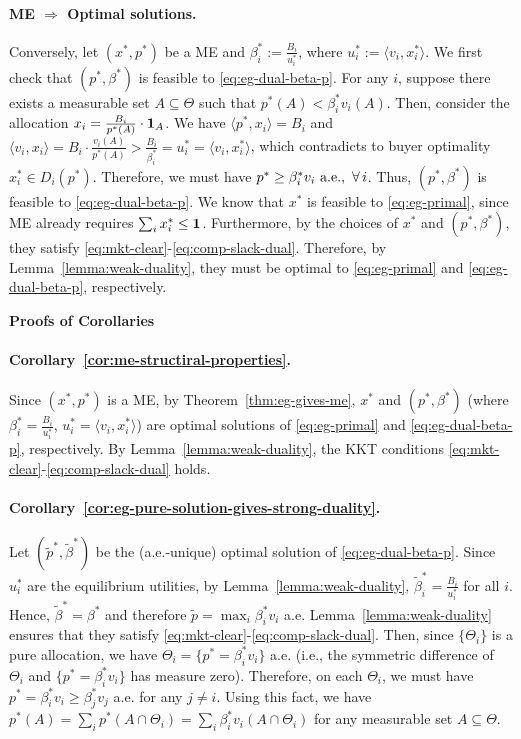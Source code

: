 	\paragraph{ME $\Rightarrow$ Optimal solutions.}
	Conversely, let $(x^*, p^*)$ be a ME and $\beta^*_i := \frac{B_i}{u^*_i}$, where $u^*_i := \langle v_i, x^*_i \rangle$. We first check that $(p^*, \beta^*)$ is feasible to \eqref{eq:eg-dual-beta-p}. For any $i$, suppose there exists a measurable set $A\subseteq \Theta$ such that $p^*(A) < \beta^*_i v_i(A)$. Then, consider the allocation $x_i = \frac{B_i}{p^*(A)} \cdot \mathbf{1}_A$. 
	We have 
	$\langle p^*, x_i \rangle = B_i$
	and 
	$\langle v_i, x_i\rangle = B_i \cdot \frac{v_i(A)}{p^*(A)} > \frac{B_i}{\beta^*_i} = u^*_i = \langle v_i, x^*_i \rangle$,
	which contradicts to buyer optimality $x^*_i \in D_i(p^*)$. 
	Therefore, we must have
	 $p^* \geq \beta^*_i v_i \ \textnormal{a.e.},\ \forall\, i$.
	Thus, $(p^*, \beta^*)$ is feasible to \eqref{eq:eg-dual-beta-p}.
	We know that $x^*$ is feasible to \eqref{eq:eg-primal}, since ME already requires $\sum_i x^*_i \leq \mathbf{1}$.
	Furthermore, by the choices of $x^*$ and $(p^*, \beta^*)$, they satisfy \eqref{eq:mkt-clear}-\eqref{eq:comp-slack-dual}.
	Therefore, by Lemma~\ref{lemma:weak-duality}, they must be optimal to \eqref{eq:eg-primal} and \eqref{eq:eg-dual-beta-p}, respectively. 

	\smallskip\noindent\textbf{Proofs of Corollaries}
	\paragraph{Corollary~\ref{cor:me-structiral-properties}.} 
	Since $(x^*, p^*)$ is a ME, by Theorem~\ref{thm:eg-gives-me}, $x^*$ and $(p^*, \beta^*)$ (where $\beta^*_i = \frac{B_i}{u^*_i}$, $u^*_i = \langle v_i, x^*_i\rangle$) are optimal solutions of \eqref{eq:eg-primal} and \eqref{eq:eg-dual-beta-p}, respectively. By Lemma~\ref{lemma:weak-duality}, the KKT conditions \eqref{eq:mkt-clear}-\eqref{eq:comp-slack-dual} holds. 

	\paragraph{Corollary~\ref{cor:eg-pure-solution-gives-strong-duality}.}
	Let $(\tilde{p}^*, \tilde{\beta}^*)$ be the (a.e.-unique) optimal solution of \eqref{eq:eg-dual-beta-p}.
	Since $u^*_i$ are the equilibrium utilities, by Lemma~\ref{lemma:weak-duality}, $\tilde{\beta}^*_i = \frac{B_i}{u^*_i}$ for all $i$. Hence, $\tilde{\beta}^* = \beta^*$ and therefore $\tilde{p} = \max_i \beta^*_i v_i$ a.e. 
	Lemma~\ref{lemma:weak-duality} ensures that they satisfy \eqref{eq:mkt-clear}-\eqref{eq:comp-slack-dual}. 
	Then, since $\{\Theta_i\}$ is a pure allocation, we have $\Theta_i = \{ p^* = \beta^*_i v_i \}$ a.e. (i.e., the symmetric difference of $\Theta_i$ and $\{ p^* = \beta^*_i v_i \}$ has measure zero). 
	Therefore, on each $\Theta_i$, we must have $p^* = \beta^*_i v_i \geq \beta^*_j v_j$ a.e. for any $j\neq i$. 
	Using this fact, we have
	$ p^*(A) = \sum_i p^*(A\cap \Theta_i) = \sum_i \beta^*_i v_i(A\cap \Theta_i)$
	for any measurable set $A \subseteq \Theta$. 

